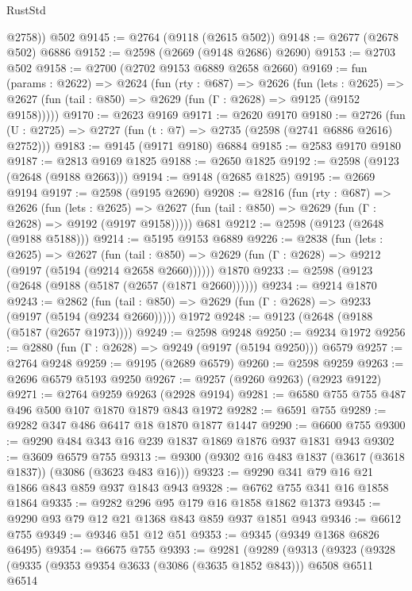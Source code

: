 \begin{lexlean}{RustStd}
\begin{coremodule}
        @2758))
    @502
@9145 := @2764 (@9118 (@2615 @502))
@9148 := @2677 (@2678 @502) @6886
@9152 := @2598 (@2669 (@9148 @2686) @2690)
@9153 := @2703 @502
@9158 := @2700 (@2702 @9153 @6889 @2658 @2660)
@9169 := fun (params : @2622) =>
  @2624
    (fun (rty : @687) =>
    @2626
      (fun (lets : @2625) =>
      @2627 (fun (tail : @850) => @2629 (fun (Γ : @2628) => @9125 (@9152 @9158)))))
@9170 := @2623 @9169
@9171 := @2620 @9170
@9180 := @2726 (fun (U : @2725) => @2727 (fun (t : @7) => @2735 (@2598 (@2741 @6886 @2616) @2752)))
@9183 := @9145 (@9171 @9180) @6884
@9185 := @2583 @9170 @9180
@9187 := @2813 @9169 @1825
@9188 := @2650 @1825
@9192 := @2598 (@9123 (@2648 (@9188 @2663)))
@9194 := @9148 (@2685 @1825)
@9195 := @2669 @9194
@9197 := @2598 (@9195 @2690)
@9208 := @2816
    (fun (rty : @687) =>
    @2626
      (fun (lets : @2625) =>
      @2627 (fun (tail : @850) => @2629 (fun (Γ : @2628) => @9192 (@9197 @9158)))))
    @681
@9212 := @2598 (@9123 (@2648 (@9188 @5188)))
@9214 := @5195 @9153 @6889
@9226 := @2838
    (fun (lets : @2625) =>
    @2627
      (fun (tail : @850) => @2629 (fun (Γ : @2628) => @9212 (@9197 (@5194 (@9214 @2658 @2660))))))
    @1870
@9233 := @2598 (@9123 (@2648 (@9188 (@5187 (@2657 (@1871 @2660))))))
@9234 := @9214 @1870
@9243 := @2862
    (fun (tail : @850) => @2629 (fun (Γ : @2628) => @9233 (@9197 (@5194 (@9234 @2660)))))
    @1972
@9248 := @9123 (@2648 (@9188 (@5187 (@2657 @1973))))
@9249 := @2598 @9248
@9250 := @9234 @1972
@9256 := @2880 (fun (Γ : @2628) => @9249 (@9197 (@5194 @9250))) @6579
@9257 := @2764 @9248
@9259 := @9195 (@2689 @6579)
@9260 := @2598 @9259
@9263 := @2696 @6579 @5193 @9250
@9267 := @9257 (@9260 @9263) (@2923 @9122)
@9271 := @2764 @9259 @9263 (@2928 @9194)
@9281 := @6580 @755 @755 @487 @496 @500 @107 @1870 @1879 @843 @1972
@9282 := @6591 @755
@9289 := @9282 @347 @486 @6417 @18 @1870 @1877 @1447
@9290 := @6600 @755
@9300 := @9290 @484 @343 @16 @239 @1837 @1869 @1876 @937 @1831 @943
@9302 := @3609 @6579 @755
@9313 := @9300 (@9302 @16 @483 @1837 (@3617 (@3618 @1837)) (@3086 (@3623 @483 @16)))
@9323 := @9290 @341 @79 @16 @21 @1866 @843 @859 @937 @1843 @943
@9328 := @6762 @755 @341 @16 @1858 @1864
@9335 := @9282 @296 @95 @179 @16 @1858 @1862 @1373
@9345 := @9290 @93 @79 @12 @21 @1368 @843 @859 @937 @1851 @943
@9346 := @6612 @755
@9349 := @9346 @51 @12 @51
@9353 := @9345 (@9349 @1368 @6826 @6495)
@9354 := @6675 @755
@9393 := @9281
    (@9289
      (@9313
        (@9323
          (@9328
            (@9335
              (@9353 @9354 @3633 (@3086 (@3635 @1852 @843)))
              @6508
              @6511
              @6514

\end{coremodule}
\end{lexlean}
